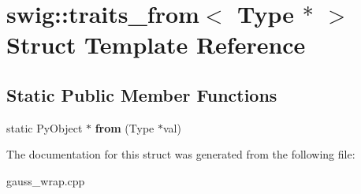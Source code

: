\hypertarget{structswig_1_1traits__from_3_01_type_01_5_01_4}{\section{swig\-:\-:traits\-\_\-from$<$ Type $\ast$ $>$ Struct Template Reference}
\label{structswig_1_1traits__from_3_01_type_01_5_01_4}
}
\subsection*{Static Public Member Functions}
\begin{DoxyCompactItemize}
\item 
\hypertarget{structswig_1_1traits__from_3_01_type_01_5_01_4_a9df365d214884ed1c08f71211f5925ad}{static Py\-Object $\ast$ {\bfseries from} (Type $\ast$val)}\label{structswig_1_1traits__from_3_01_type_01_5_01_4_a9df365d214884ed1c08f71211f5925ad}

\end{DoxyCompactItemize}


The documentation for this struct was generated from the following file\-:\begin{DoxyCompactItemize}
\item 
gauss\-\_\-wrap.\-cpp\end{DoxyCompactItemize}
